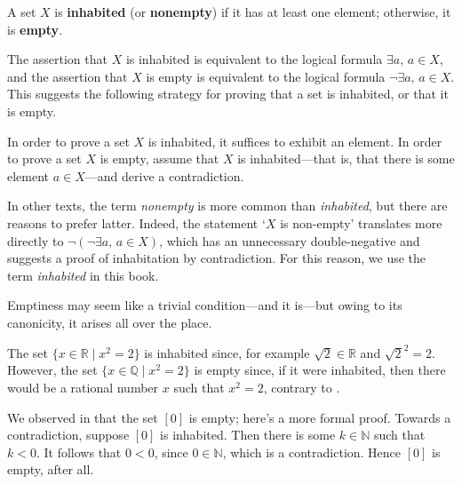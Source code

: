 \begin{definition}
\label{defInhabited}
\label{defEmptyProperty}
A set $X$ is \textbf{inhabited} (or \textbf{nonempty}) if it has at least one element; otherwise, it is \textbf{empty}.
\end{definition}

The assertion that $X$ is inhabited is equivalent to the logical formula $\exists a,\, a \in X$, and the assertion that $X$ is empty is equivalent to the logical formula $\neg \exists a,\, a \in X$. This suggests the following strategy for proving that a set is inhabited, or that it is empty.

\begin{strategy}
In order to prove a set $X$ is inhabited, it suffices to exhibit an element. In order to prove a set $X$ is empty, assume that $X$ is inhabited---that is, that there is some element $a \in X$---and derive a contradiction.
\end{strategy}

In other texts, the term \textit{nonempty} is more common than \textit{inhabited}, but there are reasons to prefer latter. Indeed, the statement `$X$ is non-empty' translates more directly to $\neg(\neg \exists a,\, a \in X)$, which has an unnecessary double-negative and suggests a proof of inhabitation by contradiction. For this reason, we use the term \textit{inhabited} in this book.

Emptiness may seem like a trivial condition---and it is---but owing to its canonicity, it arises all over the place.

\begin{example}
The set $\{ x \in \mathbb{R} \mid x^2 = 2 \}$ is inhabited since, for example $\sqrt{2} \in \mathbb{R}$ and $\sqrt{2}^2 = 2$. However, the set $\{ x \in \mathbb{Q} \mid x^2 = 2 \}$ is empty since, if it were inhabited, then there would be a rational number $x$ such that $x^2 = 2$, contrary to .
\end{example}

\begin{example}
We observed in  that the set $[0]$ is empty; here's a more formal proof. Towards a contradiction, suppose $[0]$ is inhabited. Then there is some $k \in \mathbb{N}$ such that $k < 0$. It follows that $0 < 0$, since $0 \in \mathbb{N}$, which is a contradiction. Hence $[0]$ is empty, after all.
\end{example}

